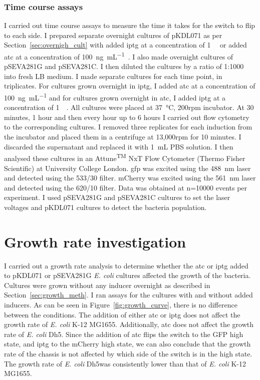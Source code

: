 \subsubsection{Time course assays}
\label{sec:flo_time}
I carried out time course assays to measure the time it takes for the switch to flip to each side. I prepared separate overnight cultures of pKDL071 as per Section~\ref{sec:overnigh_cult} with added \acrshort{iptg} at a concentration of \SI{1}{\milli\molar} or added \acrshort{atc} at a concentration of \SI{100}{\nano\gram\per\milli\liter}~\autocite{Litcofsky:2012gr}. I also made overnight cultures of pSEVA281G and pSEVA281C. I then diluted the cultures by a ratio of 1:1000 into fresh LB medium. I made separate cultures for each time point, in triplicates. For cultures grown overnight in \acrshort{iptg}, I added \acrshort{atc} at a concentration of \SI{100}{\nano\gram\per\milli\liter} and for cultures grown overnight in \acrshort{atc}, I added \acrshort{iptg} at a concentration of \SI{1}{\milli\molar}. All cultures were placed at \SI{37}{\celsius}, 200rpm incubator. At 30 minutes, 1 hour and then every hour up to 6 hours I carried out flow cytometry to the corresponding cultures. I removed three replicates for each induction from the incubator and placed them in a centrifuge at 13,000rpm for 10 minutes. I discarded the supernatant and replaced it with \SI{1}{\milli\liter} PBS solution. I then analysed these cultures in an Attune\textsuperscript{TM} NxT Flow Cytometer (Thermo Fisher Scientific) at University College London. \acrshort{gfp} was excited using the \SI{488}{\nano\meter} laser and detected using the 533/30 filter. mCherry was excited using the \SI{561}{\nano\meter} laser and detected using the 620/10 filter. Data was obtained at n=10000 events per experiment. I used pSEVA281G and pSEVA281C cultures to set the laser voltages and pKDL071 cultures to detect the bacteria population.  

\clearpage
\section{Growth rate investigation}

I carried out a growth rate analysis to determine whether the \acrshort{atc} or \acrshort{iptg} added to pKDL071 or pSEVA281G \textit{E. coli} cultures affected the growth of the bacteria. Cultures were grown without any inducer overnight as described in Section~\ref{sec:growth_meth}. I ran assays for the cultures with and without added inducers. As can be seen in Figure~\ref{fig:growth_curve}, there is no difference between the conditions. The addition of either \acrshort{atc} or \acrshort{iptg} does not affect the growth rate of \textit{E. coli} K-12 MG1655. Additionally, \acrshort{atc} does not affect the growth rate of \textit{E. coli} Dh5\textalpha. Since the addition of \acrshort{atc} flips the switch to the GFP high state, and \acrshort{iptg} to the mCherry high state, we can also conclude that the growth rate of the chassis is not affected by which side of the switch is in the high state. The growth rate of \textit{E. coli} Dh5\textalpha was consistently lower than that of \textit{E. coli} K-12 MG1655.

